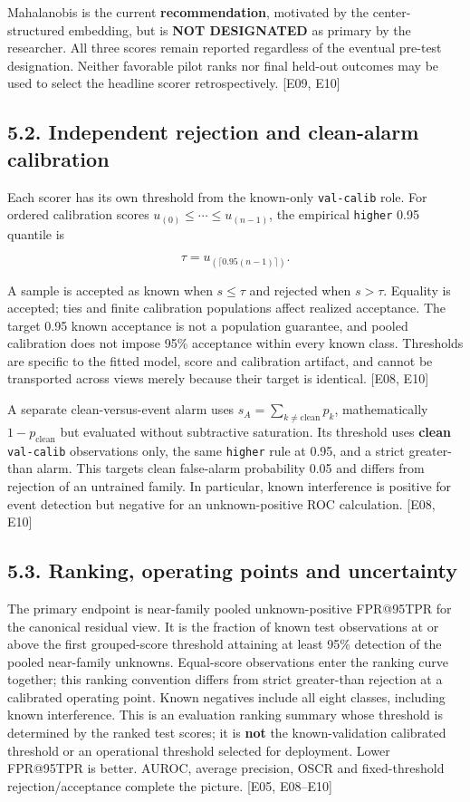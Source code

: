 \documentclass[
  10pt,
]{article}
\begin{document}
Mahalanobis is the current \textbf{recommendation}, motivated by the
center-structured embedding, but is \textbf{NOT DESIGNATED} as primary
by the researcher. All three scores remain reported regardless of the
eventual pre-test designation. Neither favorable pilot ranks nor final
held-out outcomes may be used to select the headline scorer
retrospectively. {[}E09, E10{]}

\subsection{5.2. Independent rejection and clean-alarm
calibration}\label{independent-rejection-and-clean-alarm-calibration}

Each scorer has its own threshold from the known-only \texttt{val-calib}
role. For ordered calibration scores \(u_{(0)}\le\cdots\le u_{(n-1)}\),
the empirical \texttt{higher} 0.95 quantile is

\[\tau=u_{(\lceil0.95(n-1)\rceil)}.\]

A sample is accepted as known when \(s\le\tau\) and rejected when
\(s>\tau\). Equality is accepted; ties and finite calibration
populations affect realized acceptance. The target 0.95 known acceptance
is not a population guarantee, and pooled calibration does not impose
95\% acceptance within every known class. Thresholds are specific to the
fitted model, score and calibration artifact, and cannot be transported
across views merely because their target is identical. {[}E08, E10{]}

A separate clean-versus-event alarm uses
\(s_A=\sum_{k\ne\mathrm{clean}}p_k\), mathematically
\(1-p_{\mathrm{clean}}\) but evaluated without subtractive saturation.
Its threshold uses \textbf{clean} \texttt{val-calib} observations only,
the same \texttt{higher} rule at 0.95, and a strict greater-than alarm.
This targets clean false-alarm probability 0.05 and differs from
rejection of an untrained family. In particular, known interference is
positive for event detection but negative for an unknown-positive ROC
calculation. {[}E08, E10{]}

\subsection{5.3. Ranking, operating points and
uncertainty}\label{ranking-operating-points-and-uncertainty}

The primary endpoint is near-family pooled unknown-positive FPR@95TPR
for the canonical residual view. It is the fraction of known test
observations at or above the first grouped-score threshold attaining at
least 95\% detection of the pooled near-family unknowns. Equal-score
observations enter the ranking curve together; this ranking convention
differs from strict greater-than rejection at a calibrated operating
point. Known negatives include all eight classes, including known
interference. This is an evaluation ranking summary whose threshold is
determined by the ranked test scores; it is \textbf{not} the
known-validation calibrated threshold or an operational threshold
selected for deployment. Lower FPR@95TPR is better. AUROC, average
precision, OSCR and fixed-threshold rejection/acceptance complete the
picture. {[}E05, E08--E10{]}
\end{document}
